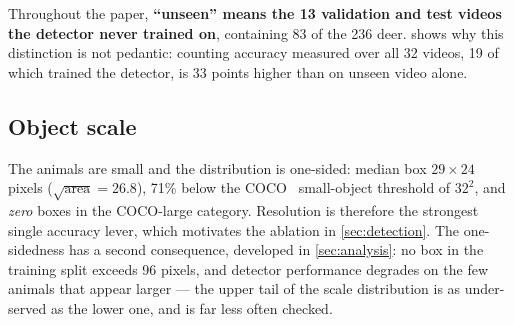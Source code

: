 Throughout the paper, \textbf{``unseen'' means the 13 validation and test videos the
detector never trained on}, containing 83 of the 236 deer.  shows why
this distinction is not pedantic: counting accuracy measured over all 32 videos, 19 of which
trained the detector, is 33 points higher than on unseen video alone.

\subsection{Object scale}

The animals are small and the distribution is one-sided: median box $29\times24$ pixels
($\sqrt{\text{area}}=26.8$), 71\% below the COCO~\cite{lin2014coco} small-object threshold
of $32^2$, and \emph{zero} boxes in the COCO-large category. Resolution is therefore the
strongest single accuracy lever, which motivates the ablation in \cref{sec:detection}. The one-sidedness has a second consequence, developed in \cref{sec:analysis}: no box in the
training split exceeds 96 pixels, and detector performance degrades on the few animals that
appear larger --- the upper tail of the scale distribution is as under-served as the lower
one, and is far less often checked.
